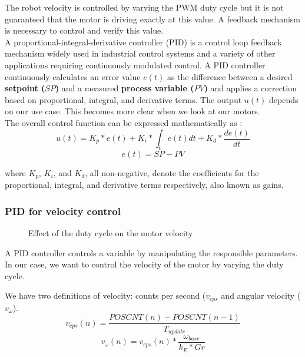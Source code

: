The robot velocity is controlled by varying the PWM duty cycle but it is not guaranteed that the motor is driving exactly at this value. A feedback mechanism is necessary to control and verify this value.\\
\vskip 0.1in
\noindent
A proportional-integral-derivative controller (PID) is a control loop feedback mechanism widely used in industrial control systems and a variety of other applications requiring continuously modulated control. A PID controller continuously calculates an error value $e(t)$ as the difference between a desired \textbf{setpoint ($SP$)} and a measured \textbf{process variable ($PV$)} and applies a correction based on proportional, integral, and derivative terms. The output $u(t)$ depends on our use case. This becomes more clear when we look at our motors.\\
The overall control function can be expressed mathematically as : 
$$u(t)= K_{p}*e(t) + K_{i}*\int_t e(t) dt + K_{d}*\frac{d e(t)}{dt} $$
$$e(t) = SP - PV$$
 
where $K_p$, $K_i$, and $K_d$, all non-negative, denote the coefficients for the proportional, integral, and derivative terms respectively, also known as gains.

\subsubsection*{PID for velocity control}

\begin{figure}
    \centering
{}
    \caption{Effect of the duty cycle on the motor velocity} \label{fig:DC_V}
\end{figure}


A PID controller controls a variable by manipulating the responsible parameters. In our case, we want to control the velocity of the motor by varying the duty cycle. 

We have two definitions of velocity: counts per second ($v_{cps}$ and angular velocity ($v_\omega$).
$$v_{cps}(n) = \frac{POSCNT(n) - POSCNT(n-1)}{T_{update}}$$
$$v_{\omega}(n) = v_{cps}(n) * \frac{\omega_{base}}{k_{E}*Gr}$$

